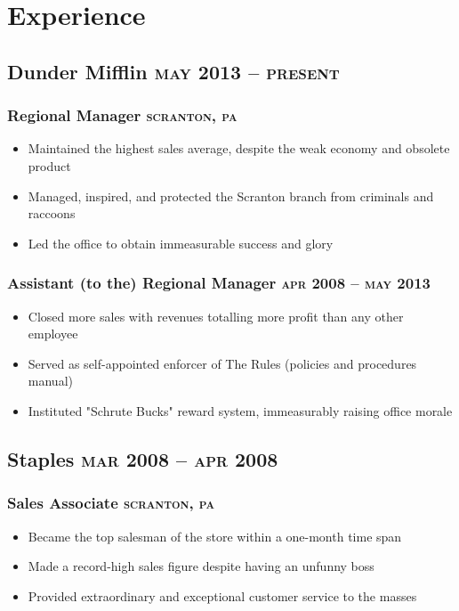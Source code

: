 \documentclass{article}
\newcommand{\rside}[1]{\hfill \normalfont\scshape\MakeLowercase{#1}}
\begin{document}
\section{\faChartPie\enspace Experience}
\subsection{Dunder Mifflin \rside{May 2013 -- Present}}
\subsubsection{Regional Manager \rside{Scranton, PA}}
\begin{itemize}
  \item Maintained the highest sales average, despite the weak economy and obsolete product
  \item Managed, inspired, and protected the Scranton branch from criminals and raccoons
  \item Led the office to obtain immeasurable success and glory
\end{itemize}

\subsubsection{Assistant (to the) Regional Manager \rside{Apr 2008 -- May 2013}}
\begin{itemize}
  \item Closed more sales with revenues totalling more profit than any other employee
  \item Served as self-appointed enforcer of The Rules (policies and procedures manual)
  \item Instituted "Schrute Bucks" reward system, immeasurably raising office morale
\end{itemize}
  
\subsection{Staples \rside{Mar 2008 -- Apr 2008}}
\subsubsection{Sales Associate \rside{Scranton, PA}}
\begin{itemize}
  \item Became the top salesman of the store within a one-month time span
  \item Made a record-high sales figure despite having an unfunny boss
  \item Provided extraordinary and exceptional customer service to the masses
\end{itemize}
\end{document}
